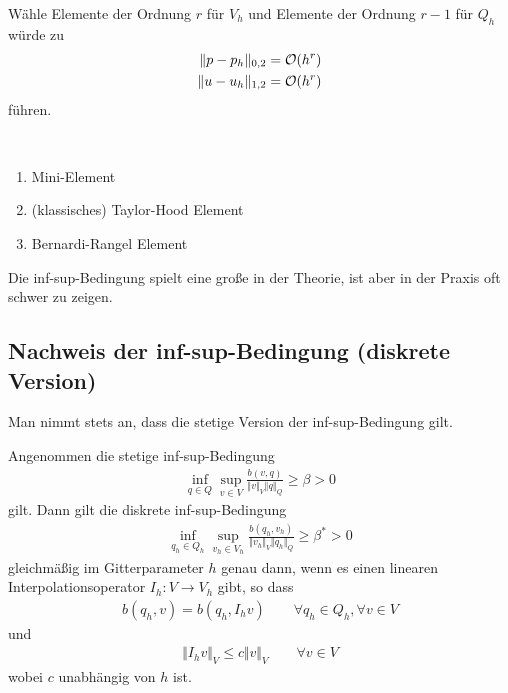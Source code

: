 Wähle Elemente der Ordnung $r$ für $V_h$ und Elemente der Ordnung $r-1$ für $Q_h$ würde zu 
\begin{align*}
	\Vert p-p_h\Vert_{0,2}&=\mathcal{O}(h^r)\\
	\Vert u-u_h\Vert_{1,2}&=\mathcal{O}(h^r)
\end{align*}
führen.

\begin{beispiel}\
	\begin{enumerate}
		\item Mini-Element
		\item (klassisches) Taylor-Hood Element
		\item Bernardi-Rangel Element
	\end{enumerate}
\end{beispiel}

Die inf-sup-Bedingung spielt eine große in der Theorie, ist aber in der Praxis oft schwer zu zeigen.

\subsection{Nachweis der inf-sup-Bedingung (diskrete Version)}
Man nimmt stets an, dass die stetige Version der inf-sup-Bedingung gilt.

\begin{lemma}[Fortin, 1977]\label{lemmaFortin}\enter
	Angenommen die stetige inf-sup-Bedingung
	\begin{align*}
		\inf\limits_{q\in Q}\sup\limits_{v\in V}\frac{b(v,q)}{\Vert v \Vert_V\Vert q\Vert_Q}\geq\beta>0
	\end{align*}
	gilt. Dann gilt die diskrete inf-sup-Bedingung
	\begin{align*}
		\inf\limits_{q_h\in Q_h}\sup\limits_{v_h\in V_h}\frac{b(q_h,v_h)}{\Vert v_h \Vert_V\Vert q_h\Vert_Q}\geq\beta^\ast>0
	\end{align*}
	gleichmäßig im Gitterparameter $h$ genau dann, wenn
	es einen linearen Interpolationsoperator $I_h\colon V\to V_h$ gibt, so dass
	\begin{align}\label{eqLemmaFortinBed1}
		b(q_h,v)=b(q_h,I_h v)\qquad\forall q_h\in Q_h,\forall v\in V
	\end{align}
	und 
	\begin{align}\label{eqLemmaFortinBed2}
		\Vert I_h v\Vert_V\leq c\Vert v\Vert_V\qquad\forall v\in V
	\end{align}
	wobei $c$ unabhängig von $h$ ist.
\end{lemma}

